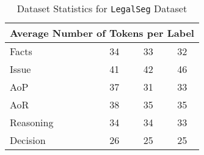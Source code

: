 \begin{table}[t]
{\begin{tabular}{lccc}
\multicolumn{4}{c}{\textbf{Average Number of Tokens per Label}} \\ 
\midrule
Facts                                     & 34              & 33                   & 32             \\ 
Issue                                     & 41              & 42                   & 46             \\ 
AoP             & 37              & 31                   & 33             \\ 
AoR             & 38              & 35                   & 35             \\ 
Reasoning                                 & 34              & 34                   & 33             \\ 
Decision                                  & 26              & 25                   & 25             \\ 
\bottomrule
\end{tabular}
}
\caption{Dataset Statistics for \texttt{LegalSeg} Dataset}
\label{tab:merged_dataset_stats}
\end{table}



